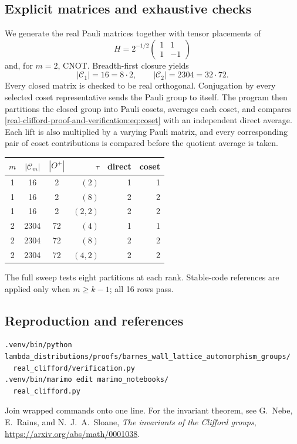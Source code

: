 \documentclass[10pt]{article}
\begin{document}
\subsection{Explicit matrices and exhaustive checks}
We generate the real Pauli matrices together with tensor placements of
\[
 H=2^{-1/2}\begin{pmatrix}1&1\\1&-1\end{pmatrix}
\]
and, for $m=2$, CNOT.  Breadth-first closure yields
\[
|\mathcal C_1|=16=8\cdot2,
\qquad |\mathcal C_2|=2304=32\cdot72.
\]
Every closed matrix is checked to be real orthogonal.  Conjugation by every
selected coset representative sends the Pauli group to itself.  The program
then partitions the closed group into Pauli cosets, averages each coset, and
compares \eqref{real-clifford-proof-and-verification:eq:coset} with an independent direct average.  Each lift is
also multiplied by a varying Pauli matrix, and every corresponding pair of
coset contributions is compared before the quotient average is taken.

\begin{center}
\begin{tabular}{@{}cccrrr@{}}\toprule
$m$&$|\mathcal C_m|$&$|O^+|$&$\tau$&direct&coset\\\midrule
1&16&2&$(2)$&1&1\\
1&16&2&$(8)$&2&2\\
1&16&2&$(2,2)$&2&2\\
2&2304&72&$(4)$&1&1\\
2&2304&72&$(8)$&2&2\\
2&2304&72&$(4,2)$&2&2\\\bottomrule
\end{tabular}
\end{center}
The full sweep tests eight partitions at each rank.  Stable-code references
are applied only when $m\geq k-1$; all 16 rows pass.

\subsection{Reproduction and references}
\begin{verbatim}
.venv/bin/python lambda_distributions/proofs/barnes_wall_lattice_automorphism_groups/
  real_clifford/verification.py
.venv/bin/marimo edit marimo_notebooks/
  real_clifford.py
\end{verbatim}
Join wrapped commands onto one line.  For the invariant theorem, see
G.~Nebe, E.~Rains, and N.~J.~A.~Sloane,
\emph{The invariants of the Clifford groups},
\url{https://arxiv.org/abs/math/0001038}.
\endgroup
\end{document}
